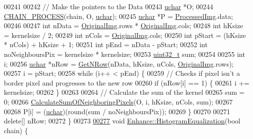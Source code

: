 \begin{DoxyCode}
00241 
00242   \textcolor{comment}{// Make the pointers to the Data}
00243   \hyperlink{_soil_math_types_8h_a65f85814a8290f9797005d3b28e7e5fc}{uchar} *O;
00244   \hyperlink{_image_processing_8h_a6e6f0183cb53c76ef458d4fd34e07bcd}{CHAIN\_PROCESS}(chain, O, \hyperlink{_soil_math_types_8h_a65f85814a8290f9797005d3b28e7e5fc}{uchar});
00245   \hyperlink{_soil_math_types_8h_a65f85814a8290f9797005d3b28e7e5fc}{uchar} *P = \hyperlink{class_vision_1_1_image_processing_aa7d65742882cd1b2a1e4e9cb68809211}{ProcessedImg}.data;
00246 
00247   \textcolor{keywordtype}{int} nData = \hyperlink{class_vision_1_1_image_processing_a77c370dab270158a4e9c634e2d3f48e7}{OriginalImg}.rows * \hyperlink{class_vision_1_1_image_processing_a77c370dab270158a4e9c634e2d3f48e7}{OriginalImg}.cols;
00248   \textcolor{keywordtype}{int} hKsize = kernelsize / 2;
00249   \textcolor{keywordtype}{int} nCols = \hyperlink{class_vision_1_1_image_processing_a77c370dab270158a4e9c634e2d3f48e7}{OriginalImg}.cols;
00250   \textcolor{keywordtype}{int} pStart = (hKsize * nCols) + hKsize + 1;
00251   \textcolor{keywordtype}{int} pEnd = nData - pStart;
00252   \textcolor{keywordtype}{int} noNeighboursPix = kernelsize * kernelsize;
00253   \hyperlink{_soil_math_types_8h_a435d1572bf3f880d55459d9805097f62}{uint32\_t} sum;
00254 
00255   \textcolor{keywordtype}{int} i;
00256   \hyperlink{_soil_math_types_8h_a65f85814a8290f9797005d3b28e7e5fc}{uchar} *nRow = \hyperlink{class_vision_1_1_image_processing_a56e17515a15eb7d246985e550fc89610}{GetNRow}(nData, hKsize, nCols, \hyperlink{class_vision_1_1_image_processing_a77c370dab270158a4e9c634e2d3f48e7}{OriginalImg}.rows);
00257   i = pStart;
00258   \textcolor{keywordflow}{while} (i++ < pEnd) \{
00259     \textcolor{comment}{// Checks if pixel isn't a border pixel and progresses to the new row}
00260     \textcolor{keywordflow}{if} (nRow[i] == 1) \{
00261       i += kernelsize;
00262     \}
00263 
00264     \textcolor{comment}{// Calculate the sum of the kernel}
00265     sum = 0;
00266     \hyperlink{class_vision_1_1_enhance_a6ff043acf8f40873141ef3bb0af4994d}{CalculateSumOfNeighboringPixels}(O, i, hKsize, nCols, sum);
00267 
00268     P[i] = (\hyperlink{_soil_math_types_8h_a65f85814a8290f9797005d3b28e7e5fc}{uchar})(round(sum / noNeighboursPix));
00269   \}
00270 
00271   \textcolor{keyword}{delete}[] nRow;
00272 \}
00273 
\hypertarget{_enhance_8cpp_source_l00277}{}\hyperlink{class_vision_1_1_enhance_aa22bf01c06e941aa40e0075fac9aad8f}{00277} \textcolor{keywordtype}{void} \hyperlink{class_vision_1_1_enhance_aa22bf01c06e941aa40e0075fac9aad8f}{Enhance::HistogramEqualization}(\textcolor{keywordtype}{bool} chain) \{

\end{DoxyCode}
